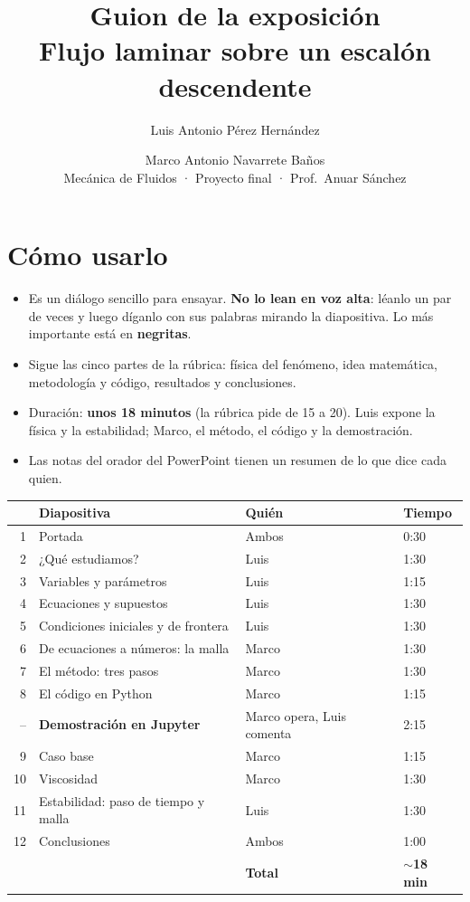 \documentclass[11pt,letterpaper]{article}
\title{\textbf{Guion de la exposición}\\[2pt]\large Flujo laminar sobre un escalón descendente}
\author{Luis Antonio Pérez Hernández \and Marco Antonio Navarrete Baños\\[4pt]
  \small Mecánica de Fluidos · Proyecto final · Prof.\ Anuar Sánchez}
\date{}
\begin{document}
\maketitle
\vspace{-1.5em}

\section*{Cómo usarlo}
\begin{itemize}
  \item Es un diálogo sencillo para ensayar. \textbf{No lo lean en voz alta}: léanlo un par de veces y luego díganlo con sus
    palabras mirando la diapositiva. Lo más importante está en \textbf{negritas}.
  \item Sigue las cinco partes de la rúbrica: física del fenómeno, idea matemática, metodología y código, resultados y
    conclusiones.
  \item Duración: \textbf{unos 18 minutos} (la rúbrica pide de 15 a 20). Luis expone la física y la estabilidad; Marco, el
    método, el código y la demostración.
  \item Las notas del orador del PowerPoint tienen un resumen de lo que dice cada quien.
\end{itemize}

\begin{table}[h]
\centering\small
\begin{tabular}{@{}rlll@{}}
\toprule
& Diapositiva & Quién & Tiempo\\
\midrule
1 & Portada & Ambos & 0:30\\
2 & ¿Qué estudiamos? & Luis & 1:30\\
3 & Variables y parámetros & Luis & 1:15\\
4 & Ecuaciones y supuestos & Luis & 1:30\\
5 & Condiciones iniciales y de frontera & Luis & 1:30\\
6 & De ecuaciones a números: la malla & Marco & 1:30\\
7 & El método: tres pasos & Marco & 1:30\\
8 & El código en Python & Marco & 1:15\\
-- & \textbf{Demostración en Jupyter} & Marco opera, Luis comenta & 2:15\\
9 & Caso base & Marco & 1:15\\
10 & Viscosidad & Marco & 1:30\\
11 & Estabilidad: paso de tiempo y malla & Luis & 1:30\\
12 & Conclusiones & Ambos & 1:00\\
\midrule
& & \textbf{Total} & \textbf{$\sim$18 min}\\
\bottomrule
\end{tabular}
\end{table}
\end{document}
